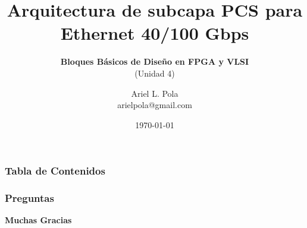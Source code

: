 \documentclass[xcolor=table,ps]{beamer}
\title[Arquitectura de subcapa PCS para Ethernet 40/100 Gbps] %
      {\textbf{Arquitectura de subcapa PCS para Ethernet 40/100 Gbps}}
\subtitle{\textbf{Bloques Básicos de Diseño en FPGA y VLSI} \\\small(Unidad 4)} %
\author[] {\large Ariel L. Pola\\arielpola@gmail.com}
\date{\today} %
\begin{document}
\begin{frame}
  \titlepage
\end{frame}



\begin{frame} 
  \frametitle{\textbf{Tabla de Contenidos}}
  \tableofcontents
\end{frame}




%
%
%

%   
%   


\begin{frame}%
  \frametitle{\textbf{Preguntas}}
   \begin{center}
     {\Huge \textbf{Muchas Gracias}}
    \end{center}
\end{frame}
\end{document}
